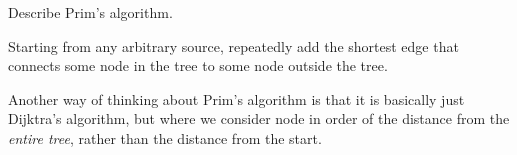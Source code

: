 \question Describe Prim's algorithm.

\begin{solution}[0.5in]
Starting from any arbitrary source, repeatedly add the shortest edge that
connects some node in the tree to some node outside the tree.

Another way of thinking about Prim's algorithm is that it is basically just
Dijktra's algorithm, but where we consider node in order of the distance from the
\emph{entire tree}, rather than the distance from the start.
\end{solution}
